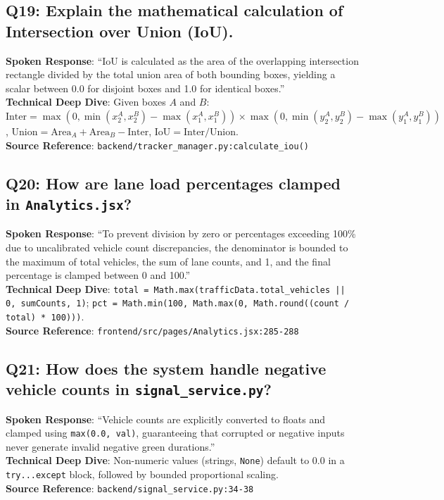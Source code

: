 \documentclass[11pt,a4paper,oneside]{report}
\begin{document}
\subsection*{Q19: Explain the mathematical calculation of Intersection over Union (IoU).}
\begin{interviewbox}
\textbf{Spoken Response}: ``IoU is calculated as the area of the overlapping intersection rectangle divided by the total union area of both bounding boxes, yielding a scalar between 0.0 for disjoint boxes and 1.0 for identical boxes.''\\
\textbf{Technical Deep Dive}: Given boxes $A$ and $B$: $\text{Inter} = \max(0, \min(x_2^A, x_2^B) - \max(x_1^A, x_1^B)) \times \max(0, \min(y_2^A, y_2^B) - \max(y_1^A, y_1^B))$, $\text{Union} = \text{Area}_A + \text{Area}_B - \text{Inter}$, $\text{IoU} = \text{Inter} / \text{Union}$.\\
\textbf{Source Reference}: \texttt{backend/tracker\_manager.py:calculate\_iou()}
\end{interviewbox}

\subsection*{Q20: How are lane load percentages clamped in \texttt{Analytics.jsx}?}
\begin{interviewbox}
\textbf{Spoken Response}: ``To prevent division by zero or percentages exceeding 100\% due to uncalibrated vehicle count discrepancies, the denominator is bounded to the maximum of total vehicles, the sum of lane counts, and 1, and the final percentage is clamped between 0 and 100.''\\
\textbf{Technical Deep Dive}: \texttt{total = Math.max(trafficData.total\_vehicles || 0, sumCounts, 1)}; \texttt{pct = Math.min(100, Math.max(0, Math.round((count / total) * 100)))}.\\
\textbf{Source Reference}: \texttt{frontend/src/pages/Analytics.jsx:285-288}
\end{interviewbox}

\subsection*{Q21: How does the system handle negative vehicle counts in \texttt{signal\_service.py}?}
\begin{interviewbox}
\textbf{Spoken Response}: ``Vehicle counts are explicitly converted to floats and clamped using \texttt{max(0.0, val)}, guaranteeing that corrupted or negative inputs never generate invalid negative green durations.''\\
\textbf{Technical Deep Dive}: Non-numeric values (strings, \texttt{None}) default to 0.0 in a \texttt{try...except} block, followed by bounded proportional scaling.\\
\textbf{Source Reference}: \texttt{backend/signal\_service.py:34-38}
\end{interviewbox}
\end{document}
